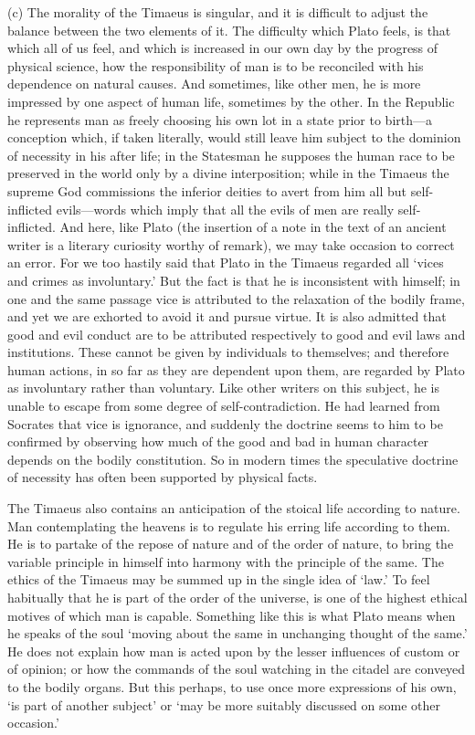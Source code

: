 \documentclass[11pt,letter]{article}
\begin{document}
\par  (c) The morality of the Timaeus is singular, and it is difficult to adjust the balance between the two elements of it. The difficulty which Plato feels, is that which all of us feel, and which is increased in our own day by the progress of physical science, how the responsibility of man is to be reconciled with his dependence on natural causes. And sometimes, like other men, he is more impressed by one aspect of human life, sometimes by the other. In the Republic he represents man as freely choosing his own lot in a state prior to birth—a conception which, if taken literally, would still leave him subject to the dominion of necessity in his after life; in the Statesman he supposes the human race to be preserved in the world only by a divine interposition; while in the Timaeus the supreme God commissions the inferior deities to avert from him all but self-inflicted evils—words which imply that all the evils of men are really self-inflicted. And here, like Plato (the insertion of a note in the text of an ancient writer is a literary curiosity worthy of remark), we may take occasion to correct an error. For we too hastily said that Plato in the Timaeus regarded all ‘vices and crimes as involuntary.’ But the fact is that he is inconsistent with himself; in one and the same passage vice is attributed to the relaxation of the bodily frame, and yet we are exhorted to avoid it and pursue virtue. It is also admitted that good and evil conduct are to be attributed respectively to good and evil laws and institutions. These cannot be given by individuals to themselves; and therefore human actions, in so far as they are dependent upon them, are regarded by Plato as involuntary rather than voluntary. Like other writers on this subject, he is unable to escape from some degree of self-contradiction. He had learned from Socrates that vice is ignorance, and suddenly the doctrine seems to him to be confirmed by observing how much of the good and bad in human character depends on the bodily constitution. So in modern times the speculative doctrine of necessity has often been supported by physical facts.

\par  The Timaeus also contains an anticipation of the stoical life according to nature. Man contemplating the heavens is to regulate his erring life according to them. He is to partake of the repose of nature and of the order of nature, to bring the variable principle in himself into harmony with the principle of the same. The ethics of the Timaeus may be summed up in the single idea of ‘law.’ To feel habitually that he is part of the order of the universe, is one of the highest ethical motives of which man is capable. Something like this is what Plato means when he speaks of the soul ‘moving about the same in unchanging thought of the same.’ He does not explain how man is acted upon by the lesser influences of custom or of opinion; or how the commands of the soul watching in the citadel are conveyed to the bodily organs. But this perhaps, to use once more expressions of his own, ‘is part of another subject’ or ‘may be more suitably discussed on some other occasion.’
\end{document}
